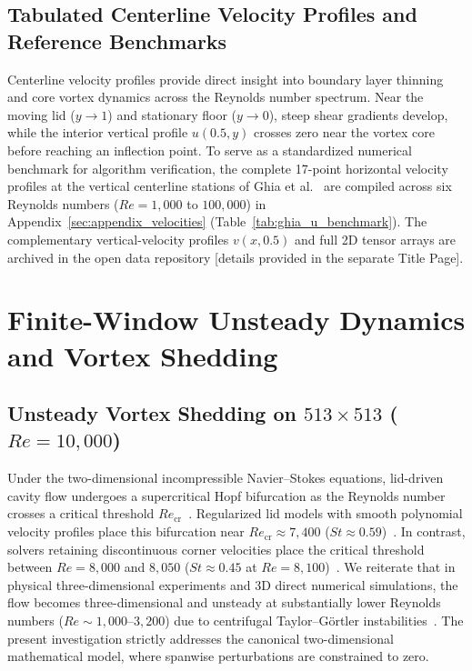 \documentclass[11pt,a4paper]{article}
\begin{document}
\subsection{Tabulated Centerline Velocity Profiles and Reference Benchmarks}
\label{sec:centerline_profiles}
Centerline velocity profiles provide direct insight into boundary layer thinning and core vortex dynamics across the Reynolds number spectrum. Near the moving lid ($y \to 1$) and stationary floor ($y \to 0$), steep shear gradients develop, while the interior vertical profile $u(0.5, y)$ crosses zero near the vortex core before reaching an inflection point. To serve as a standardized numerical benchmark for algorithm verification, the complete 17-point horizontal velocity profiles at the vertical centerline stations of Ghia et al.~\cite{ghia1982high} are compiled across six Reynolds numbers ($Re = 1{,}000$ to $100{,}000$) in Appendix~\ref{sec:appendix_velocities} (Table~\ref{tab:ghia_u_benchmark}). The complementary vertical-velocity profiles $v(x, 0.5)$ and full 2D tensor arrays are archived in the open data repository [details provided in the separate Title Page].

\section{Finite-Window Unsteady Dynamics and Vortex Shedding}

\subsection{Unsteady Vortex Shedding on \texorpdfstring{$513 \times 513$}{513x513} (\texorpdfstring{$Re = 10,000$}{Re = 10000})}
Under the two-dimensional incompressible Navier--Stokes equations, lid-driven cavity flow undergoes a supercritical Hopf bifurcation as the Reynolds number crosses a critical threshold $Re_{\text{cr}}$~\cite{shen1991hopf,peng2003transition,bruneau20062d,auteri2002numerical}. Regularized lid models with smooth polynomial velocity profiles place this bifurcation near $Re_{\text{cr}} \approx 7{,}400$ ($St \approx 0.59$)~\cite{peng2003transition,shen1991hopf}. In contrast, solvers retaining discontinuous corner velocities place the critical threshold between $Re = 8{,}000$ and $8{,}050$ ($St \approx 0.45$ at $Re = 8{,}100$)~\cite{bruneau20062d,auteri2002numerical}. We reiterate that in physical three-dimensional experiments and 3D direct numerical simulations, the flow becomes three-dimensional and unsteady at substantially lower Reynolds numbers ($Re \sim 1{,}000\text{--}3{,}200$) due to centrifugal Taylor--G\"ortler instabilities~\cite{koseff1984hydrothermal,aidun1991primary,albensoeder2001three}. The present investigation strictly addresses the canonical two-dimensional mathematical model, where spanwise perturbations are constrained to zero.
\end{document}
